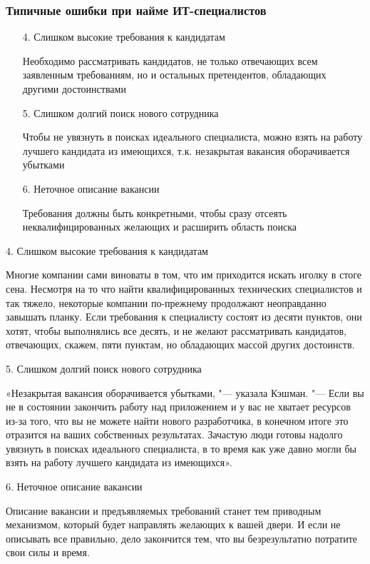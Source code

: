 \documentclass{../industrial-development}
\begin{document}
\begin{frame} \frametitle{Типичные ошибки при найме ИТ-специалистов}
  \begin{itemize}
\item[4.] Слишком высокие требования к кандидатам

{\small Необходимо рассматривать кандидатов, не только отвечающих всем заявленным требованиям, но и остальных претендентов, обладающих другими достоинствами} 

\item[5.] Слишком долгий поиск нового сотрудника

{\small Чтобы не увязнуть в поисках идеального специалиста, можно взять на работу лучшего кандидата из имеющихся, т.к. незакрытая вакансия оборачивается убытками}

\item[6.] Неточное описание вакансии

{\small Требования должны быть конкретными, чтобы сразу отсеять неквалифицированных желающих и расширить область поиска}
 \end{itemize}

\end{frame}

\lecturenotes

4. \alert{Слишком высокие требования к кандидатам}

Многие компании сами виноваты в том, что им приходится искать иголку в стоге сена. Несмотря на то что найти квалифицированных технических специалистов и так тяжело, некоторые компании по-прежнему продолжают неоправданно завышать планку. Если требования к специалисту состоят из десяти пунктов, они хотят, чтобы выполнялись все десять, и не желают рассматривать кандидатов, отвечающих, скажем, пяти пунктам, но обладающих массой других достоинств.

5. \alert{Слишком долгий поиск нового сотрудника}

«Незакрытая вакансия оборачивается убытками, "--- указала Кэшман. "--- Если вы не в состоянии закончить работу над приложением и у вас не хватает ресурсов из-за того, что вы не можете найти нового разработчика, в конечном итоге это отразится на ваших собственных результатах. Зачастую люди готовы надолго увязнуть в поисках идеального специалиста, в то время как уже давно могли бы взять на работу лучшего кандидата из имеющихся».

6. \alert{Неточное описание вакансии}

Описание вакансии и предъявляемых требований станет тем приводным механизмом, который будет направлять желающих к вашей двери. И если не описывать все правильно, дело закончится тем, что вы безрезультатно потратите свои силы и время.
\end{document}
